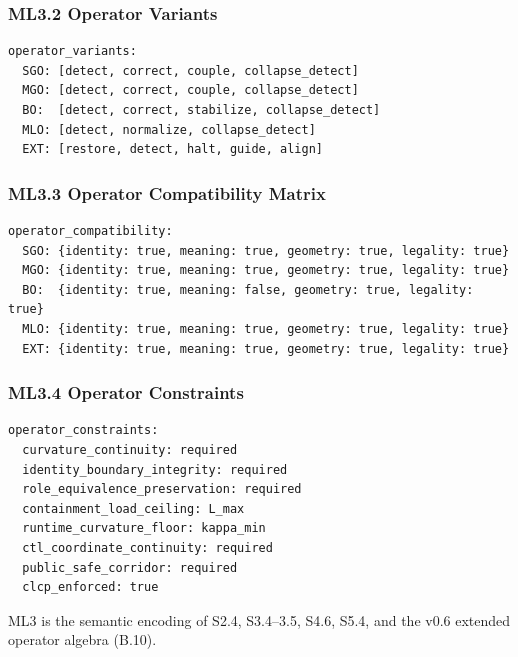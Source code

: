 \subsubsection*{ML3.2 Operator Variants}

\begin{verbatim}
operator_variants:
  SGO: [detect, correct, couple, collapse_detect]
  MGO: [detect, correct, couple, collapse_detect]
  BO:  [detect, correct, stabilize, collapse_detect]
  MLO: [detect, normalize, collapse_detect]
  EXT: [restore, detect, halt, guide, align]
\end{verbatim}

\subsubsection*{ML3.3 Operator Compatibility Matrix}

\begin{verbatim}
operator_compatibility:
  SGO: {identity: true, meaning: true, geometry: true, legality: true}
  MGO: {identity: true, meaning: true, geometry: true, legality: true}
  BO:  {identity: true, meaning: false, geometry: true, legality: true}
  MLO: {identity: true, meaning: true, geometry: true, legality: true}
  EXT: {identity: true, meaning: true, geometry: true, legality: true}
\end{verbatim}

\subsubsection*{ML3.4 Operator Constraints}

\begin{verbatim}
operator_constraints:
  curvature_continuity: required
  identity_boundary_integrity: required
  role_equivalence_preservation: required
  containment_load_ceiling: L_max
  runtime_curvature_floor: kappa_min
  ctl_coordinate_continuity: required
  public_safe_corridor: required
  clcp_enforced: true
\end{verbatim}

ML3 is the semantic encoding of S2.4, S3.4–3.5, S4.6, S5.4, and the v0.6
extended operator algebra (B.10).


